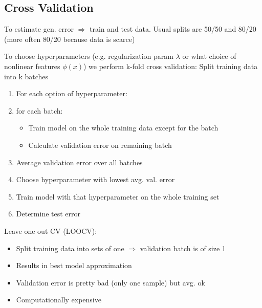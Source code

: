 \subsection{Cross Validation}

To estimate gen. error $\Rightarrow$ train and test data. Usual splits are 50/50 and 80/20 (more often 80/20 because data is scarce)

To choose hyperparameters (e.g. regularization param $\lambda$ or what choice of nonlinear features $\phi(x)$) we perform k-fold cross validation:
Split training data into k batches
\begin{enumerate}
    \item For each option of hyperparameter:
    \item for each batch: \begin{itemize}
        \item Train model on the whole training data except for the batch
        \item Calculate validation error on remaining batch
    \end{itemize}
    \item Average validation error over all batches
    \item Choose hyperparameter with lowest avg. val. error
    \item Train model with that hyperparameter on the whole training set
    \item Determine test error
\end{enumerate}

Leave one out CV (LOOCV): 
\begin{itemize}
    \item Split training data into sets of one $\Rightarrow$ validation batch is of size 1
    \item Results in best model approximation
    \item Validation error is pretty bad (only one sample) but avg. ok
    \item Computationally expensive 
\end{itemize}